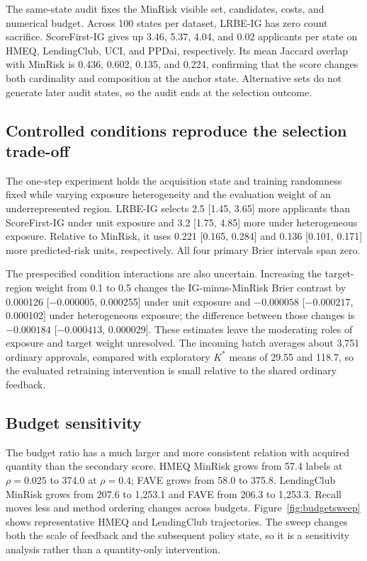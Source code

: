 The same-state audit fixes the MinRisk visible set, candidates, costs, and numerical budget. Across 100 states per dataset, LRBE-IG has zero count sacrifice. ScoreFirst-IG gives up 3.46, 5.37, 4.04, and 0.02 applicants per state on HMEQ, LendingClub, UCI, and PPDai, respectively. Its mean Jaccard overlap with MinRisk is 0.436, 0.602, 0.135, and 0.224, confirming that the score changes both cardinality and composition at the anchor state. Alternative sets do not generate later audit states, so the audit ends at the selection outcome.

\subsection{Controlled conditions reproduce the selection trade-off}
The one-step experiment holds the acquisition state and training randomness fixed while varying exposure heterogeneity and the evaluation weight of an underrepresented region. LRBE-IG selects 2.5 [1.45, 3.65] more applicants than ScoreFirst-IG under unit exposure and 3.2 [1.75, 4.85] more under heterogeneous exposure. Relative to MinRisk, it uses 0.221 [0.165, 0.284] and 0.136 [0.101, 0.171] more predicted-risk units, respectively. All four primary Brier intervals span zero.

The prespecified condition interactions are also uncertain. Increasing the target-region weight from 0.1 to 0.5 changes the IG-minus-MinRisk Brier contrast by 0.000126 [$-0.000005$, 0.000255] under unit exposure and $-0.000058$ [$-0.000217$, 0.000102] under heterogeneous exposure; the difference between those changes is $-0.000184$ [$-0.000413$, 0.000029]. These estimates leave the moderating roles of exposure and target weight unresolved. The incoming batch averages about 3,751 ordinary approvals, compared with exploratory $K^*$ means of 29.55 and 118.7, so the evaluated retraining intervention is small relative to the shared ordinary feedback.

\subsection{Budget sensitivity}
The budget ratio has a much larger and more consistent relation with acquired quantity than the secondary score. HMEQ MinRisk grows from 57.4 labels at $\rho=0.025$ to 374.0 at $\rho=0.4$; FAVE grows from 58.0 to 375.8. LendingClub MinRisk grows from 207.6 to 1,253.1 and FAVE from 206.3 to 1,253.3. Recall moves less and method ordering changes across budgets. Figure~\ref{fig:budgetsweep} shows representative HMEQ and LendingClub trajectories. The sweep changes both the scale of feedback and the subsequent policy state, so it is a sensitivity analysis rather than a quantity-only intervention.

